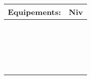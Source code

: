 \documentclass[a4paper,landscape,twocolumn]{book}
\begin{document}
\vspace{3pt} 	

\noindent\begin{tabularx}{\columnwidth}{|X|r|}
	\hline
	\cellcolor{black!10} 
	Equipements: &
	\cellcolor{black!10} 
	Niv\\ \hline
	 & \\ \hline
	 & \\ \hline
	 & \\ \hline
	 & \\ \hline
	 & \\ \hline
	 & \\ \hline
	 & \\ \hline
	 & \\ \hline
	 & \\ \hline
	 & \\ \hline
	 & \\ \hline
	 & \\ \hline
	 & \\ \hline
	 & \\ \hline
	 & \\ \hline
	 & \\ \hline
	 & \\ \hline
	 & \\ \hline
	 & \\ \hline
\end{tabularx}

\pagebreak
\end{document}
